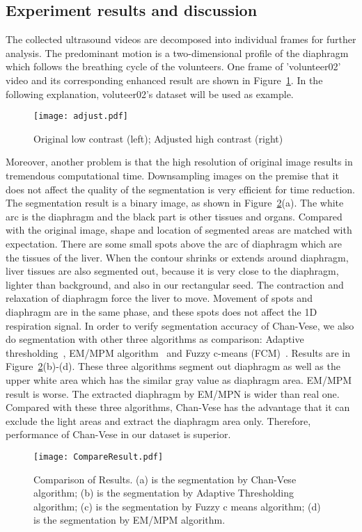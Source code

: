 \subsection{Experiment results and discussion}
The collected ultrasound videos are decomposed into individual frames for further analysis. The predominant motion is a two-dimensional profile of the diaphragm which follows the breathing cycle of the volunteers. One frame of 'volunteer02' video and its corresponding enhanced result are shown in Figure~\ref{fig.adjust}. In the following explanation, voluteer02's dataset will be used as example.
\begin{figure}[h!]
\centering
\texttt{[image: adjust.pdf]}
\caption{Original low contrast (left); Adjusted high contrast (right)}
\label{fig.adjust}
\end{figure}
Moreover, another problem is that the high resolution of original image results in tremendous computational time.  Downsampling images on the premise that it does not affect the quality of the segmentation is very efficient for time reduction. The segmentation result is a binary image, as shown in Figure~\ref{fig.segment}(a). The white arc is the diaphragm and the black part is other tissues and organs. Compared with the original image, shape and location of segmented areas are matched with expectation. There are some small spots above the arc of diaphragm which are the tissues of the liver. When the contour shrinks or extends around diaphragm, liver tissues are also segmented out, because it is very close to the diaphragm, lighter than background, and also in our rectangular seed. The contraction and relaxation of diaphragm force the liver to move. Movement of spots and diaphragm are in the same phase, and these spots does not affect the 1D respiration signal. In order to verify segmentation accuracy of Chan-Vese, we also do segmentation with other three algorithms as comparison: Adaptive thresholding~\cite{singh2012new}, EM/MPM algorithm~\cite{yang2012performance} and Fuzzy c-means (FCM)~\cite{bezdek1984fcm}. Results are in Figure~\ref{fig.segment}(b)-(d). These three algorithms segment out diaphragm as well as the upper white area which has the similar gray value as diaphragm area. EM/MPM result is worse. The extracted diaphragm by EM/MPN is wider than real one. Compared with these three algorithms, Chan-Vese has the advantage that it can exclude the light areas and extract the diaphragm area only. Therefore, performance of Chan-Vese in our dataset is superior.
\begin{figure}[h!]
\centering
\texttt{[image: CompareResult.pdf]}
\caption{Comparison of Results. (a) is the segmentation by Chan-Vese algorithm; (b) is the segmentation by Adaptive Thresholding algorithm; (c) is the segmentation by Fuzzy c means algorithm; (d) is the segmentation by EM/MPM algorithm.}
\label{fig.segment}
\end{figure}

